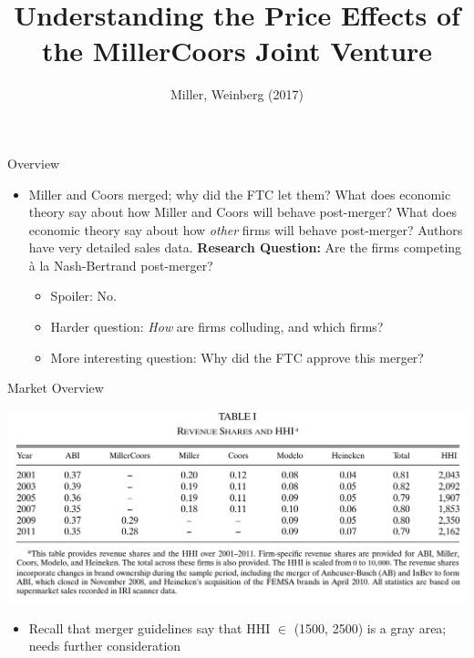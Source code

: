 \documentclass[dvipsnames]{beamer}
\title{Understanding the Price Effects of the MillerCoors Joint Venture}
\author{Miller, Weinberg (2017)}
\begin{document}
\maketitle
%
\begin{frame}{Overview}
  \begin{itemize}
  \item Miller and Coors merged; why did the FTC let them?
    \vitem What does economic theory say about how Miller and Coors will behave post-merger?
    \vitem What does economic theory say about how \emph{other} firms will behave post-merger?
    \vitem Authors have very detailed sales data.
    \vitem \textbf{Research Question:} Are the firms competing \`a la Nash-Bertrand post-merger?
    \begin{itemize}
    \item Spoiler: No.
    \item Harder question: \emph{How} are firms colluding, and which firms?
        \item More interesting question: Why did the FTC approve this merger?
    \end{itemize}
  \end{itemize}
\end{frame}
%
\begin{frame}{Market Overview}
  \begin{center}
   \includegraphics[width=\textwidth, keepaspectratio=true]{tab1.png} 
  \end{center}
  \begin{itemize}
  \item Recall that merger guidelines say that HHI $\in$ (1500, 2500) is a gray area; needs further consideration
  \end{itemize}
\end{frame}
%
\end{document}
